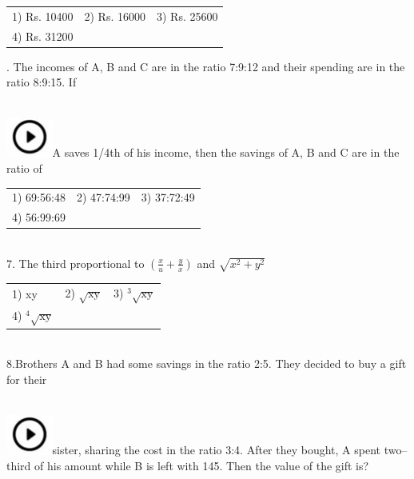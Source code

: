 \documentclass{article}
\begin{document}
\noindent 

\noindent \begin{tabular}{p{1.7in} p{1.6in} p{1.6in}} \\ 
 1) Rs. 10400               &  2) Rs. 16000        &  3) Rs. 25600         \\
4) Rs. 31200 \\
\end{tabular}

\noindent 

\noindent 

\noindent 
\newpage
{}.   The incomes of A, B and C are in the ratio 7:9:12 and their spending are in the ratio 8:9:15. If

\noindent 

\noindent  
	\noindent \\ \includegraphics*[width=0.60in, height=0.52in]{images/image1}A saves 1/4th of his income, then the savings of A, B and C are in the ratio of
\\	
\begin{tabular}{p{1.7in} p{1.6in} p{1.6in}} \\ 
 1) 69:56:48              &  2) 47:74:99       &  3) 37:72:49        \\
4) 56:99:69 \\
\end{tabular}

\noindent 

\noindent \\   7.   The third proportional to $ ( \frac{x}{u} + \frac{y}{x}) $ and $ \sqrt{x^{2} + y^{2}} $

\noindent \begin{tabular}{p{1.7in} p{1.6in} p{1.6in}} \\ 
 1) xy &  2) $\mathrm{\sqrt{xy}}$ &  3) ${}^{3}$$\mathrm{\sqrt{xy}}$  \\
4) ${}^{4}$$\mathrm{\sqrt{xy}}$ \\
\end{tabular}

\noindent 

\noindent \\   8.Brothers A and B had some savings in the ratio 2:5. They decided to buy a gift for their

\noindent 

\noindent  
	\noindent \\ \includegraphics*[width=0.60in, height=0.52in]{images/image1}sister, sharing the cost in the ratio 3:4. After they bought, A spent two--third of his amount while B is left with 145. Then the value of the gift is?
\end{document}
